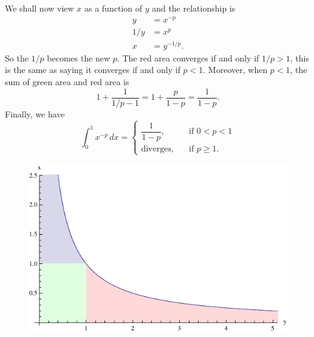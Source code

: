 \documentclass[a4paper]{amsart}
\begin{document}
    We shall now view $ x $ as a function of $ y $ and the relationship is
    \begin{align*}
    y &= x^{-p} \\
    1/y &= x^p \\
    x &= y^{-1/p}.
    \end{align*}
    So the $ 1/p $ becomes the new $ p $. The red area converges if and only if $ 1/p > 1 $, this is the same as saying it converges if and only if $ p < 1 $. Moreover, when $ p < 1 $,  the sum of green area and red area is
        \[ 1 + \frac{1}{1/p-1} = 1 + \frac{p}{1-p} = \frac{1}{1-p}. \]
    Finally, we have
    \[ \int_0^1 x^{-p} \, dx =
        \begin{cases}
        \dfrac{1}{1-p}, \qquad &\text{if } 0 < p < 1 \\[10pt]
        \text{diverges}, &\text{if } p \ge 1.
        \end{cases} \]
        
    \begin{figure}[h]
        \centering
        \includegraphics[width=0.7\linewidth]{p_integral_fig2}
        \caption{}
        \label{fig:p_integral_fig2}
    \end{figure}
    
\end{document}
